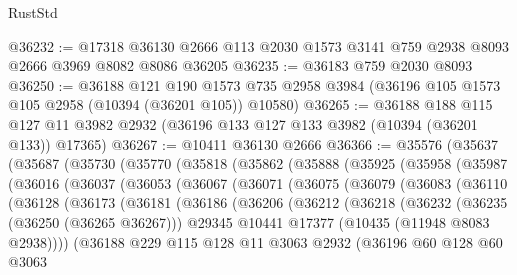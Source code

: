 \begin{lexlean}{RustStd}
\begin{coremodule}
@36232 := @17318 @36130 @2666 @113 @2030 @1573 @3141 @759 @2938 @8093 @2666 @3969 @8082 @8086 @36205
@36235 := @36183 @759 @2030 @8093
@36250 := @36188
    @121
    @190
    @1573
    @735
    @2958
    @3984
    (@36196 @105 @1573 @105 @2958 (@10394 (@36201 @105)) @10580)
@36265 := @36188
    @188
    @115
    @127
    @11
    @3982
    @2932
    (@36196 @133 @127 @133 @3982 (@10394 (@36201 @133)) @17365)
@36267 := @10411 @36130 @2666
@36366 := @35576
    (@35637
      (@35687
        (@35730
          (@35770
            (@35818
              (@35862
                (@35888
                  (@35925
                    (@35958
                      (@35987
                        (@36016
                          (@36037
                            (@36053
                              (@36067
                                (@36071
                                  (@36075
                                    (@36079
                                      (@36083
                                        (@36110
                                          (@36128
                                            (@36173
                                              (@36181
                                                (@36186
                                                  (@36206
                                                    (@36212
                                                      (@36218
                                                        (@36232
                                                          (@36235 (@36250 (@36265 @36267)))
                                                          @29345
                                                          @10441
                                                          @17377
                                                          (@10435 (@11948 @8083 @2938))))
                                                      (@36188
                                                        @229
                                                        @115
                                                        @128
                                                        @11
                                                        @3063
                                                        @2932
                                                        (@36196
                                                          @60
                                                          @128
                                                          @60
                                                          @3063

\end{coremodule}
\end{lexlean}
